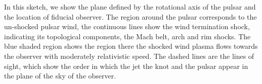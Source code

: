 \label{knot-mhd-model}
In this sketch, we show the plane defined by the rotational axis of the pulsar and the location of fiducial  observer.  The region around the pulsar corresponds to the un-shocked  pulsar wind, the continuous lines show the wind termination shock, indicating its topological components, the Mach belt, arch and rim shocks. The blue shaded region shows the region there the shocked wind plasma flows towards the observer with moderately relativistic speed. The dashed lines are the lines of sight, which show the order in which the jet the knot and the pulsar appear in the plane of the sky of the observer.   